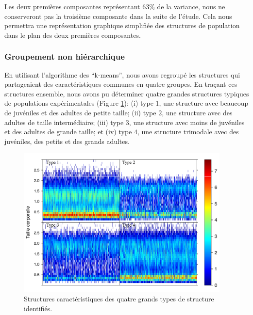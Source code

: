 Les deux premières composantes représentant $63\%$ de la variance, nous ne
conserveront pas la troisième composante dans la suite de l'étude. Cela nous
permettra une représentation graphique simplifiée des structures de population
dans le plan des deux premières composantes. 

\subsubsection{Groupement non hiérarchique}

En utilisant l'algorithme des ``k-means'', nous avons regroupé les structures
qui partageaient des caractéristiques communes en quatre groupes. En traçant ces
structures ensemble, nous avons pu déterminer quatre grandes structures typiques
de populations expérimentales (Figure \ref{fig:SP3a}): (i) type $1$, une
structure avec beaucoup de juvéniles et des adultes de petite taille; (ii) type $2$, une structure avec des
adultes de taille intermédiaire; (iii) type $3$, une structure avec moins de
juvéniles et des adultes de grande taille; et (iv) type $4$, une structure
trimodale avec des juvéniles, des petits et des grands adultes.

\begin{figure}[!ht]
\begin{center}
\includegraphics[width=0.95\textwidth]{1_CorpsDeThese/Resumes/Fig/SP02b}
\caption[Quatres grands
types de structures]{Structures caractéristiques des quatre grands types de
structure identifiés.}
\label{fig:SP3a}
\end{center}
\end{figure}

